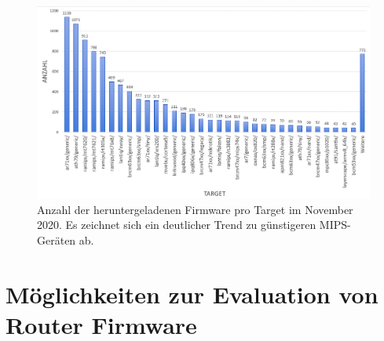 \documentclass[a4paper]{book}
\begin{document}
\begin{large}
\begin{onehalfspace}
\begin{figure}[htb]
\begin{center}
\vspace{0.2cm}

\includegraphics[scale=0.45]{images/openwrt_targets} 
\caption{Anzahl der heruntergeladenen Firmware pro Target im November 2020. Es zeichnet sich ein deutlicher Trend zu günstigeren MIPS-Geräten ab.}
\label{fig:OpenWrt Target}
\end{center}
\end{figure}


\end{onehalfspace}



\section{Möglichkeiten zur Evaluation von Router Firmware}
\label{Router Eval}




\end{large}
\end{document}
